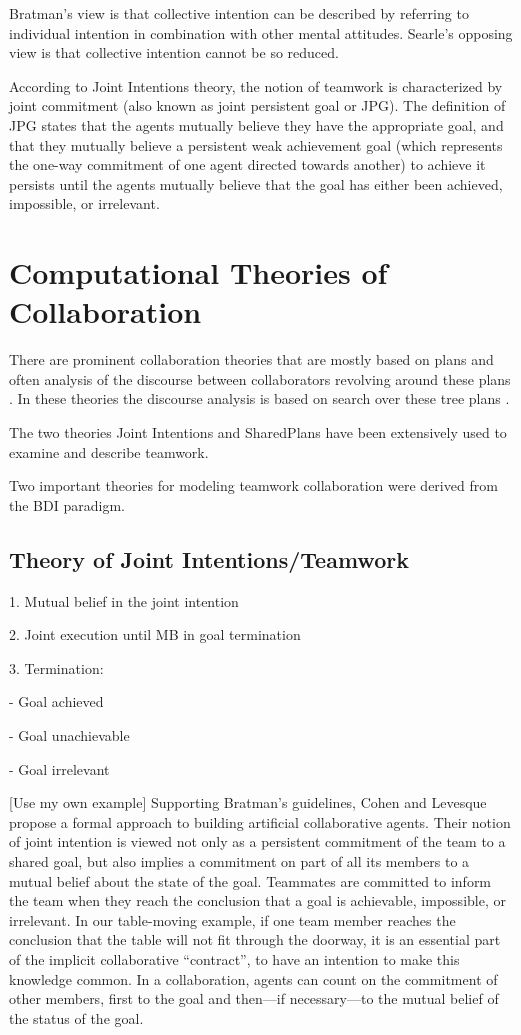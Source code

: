 \documentclass[11pt]{article}
\begin{document}
Bratman's view is that collective intention can be described by referring to
individual intention in combination with other mental attitudes. Searle's
opposing view is that collective intention cannot be so reduced.

According to Joint Intentions theory, the notion of teamwork is characterized by
joint commitment (also known as joint persistent goal or JPG). The definition of
JPG states that the agents mutually believe they have the appropriate goal, and
that they mutually believe a persistent weak achievement goal (which represents
the one-way commitment of one agent directed towards another) to achieve it
persists until the agents mutually believe that the goal has either been
achieved, impossible, or irrelevant.

\section{Computational Theories of Collaboration}

There are prominent collaboration theories that are mostly based on plans and
often analysis of the discourse between collaborators revolving around these
plans \cite{grosz:plans-discourse, Litman:discourse-commonsense}. In these
theories the discourse analysis is based on search over these tree plans
\cite{rich:discourse}.

The two theories Joint Intentions and SharedPlans have been extensively used to
examine and describe teamwork.

Two important theories for modeling teamwork collaboration were derived from
the BDI paradigm.

\subsection{Theory of Joint Intentions/Teamwork}
\label{sec:joint-intentions}

1. Mutual belief in the joint intention

2. Joint execution until MB in goal termination

3. Termination:

- Goal achieved

- Goal unachievable

- Goal irrelevant

[Use my own example] Supporting Bratman’s guidelines, Cohen and Levesque propose
a formal approach to building artificial collaborative agents. Their notion of
joint intention is viewed not only as a persistent commitment of the team to a
shared goal, but also implies a commitment on part of all its members to a
mutual belief about the state of the goal. Teammates are committed to inform the
team when they reach the conclusion that a goal is achievable, impossible, or
irrelevant. In our table-moving example, if one team member reaches the
conclusion that the table will not fit through the doorway, it is an essential
part of the implicit collaborative “contract”, to have an intention to make this
knowledge common. In a collaboration, agents can count on the commitment of
other members, first to the goal and then—if necessary—to the mutual belief of
the status of the goal.
\end{document}
